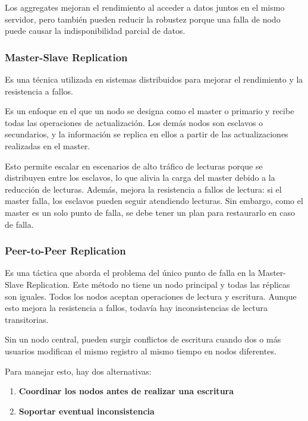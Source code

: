 \documentclass{article}
\begin{document}
		Los aggregates mejoran el rendimiento al acceder a datos juntos en el mismo servidor, pero también pueden reducir la robustez porque una falla de nodo puede causar la indisponibilidad parcial de datos.
		
		
		\subsubsection{Master-Slave Replication}
		Es una técnica utilizada en sistemas distribuidos para mejorar el rendimiento y la resistencia a fallos.
		
		Es un enfoque en el que un nodo se designa como el master o primario y recibe todas las operaciones de actualización. Los demás nodos son esclavos o secundarios, y la información se replica en ellos a partir de las actualizaciones realizadas en el master.
		
		Esto permite escalar en escenarios de alto tráfico de lecturas porque se distribuyen entre los esclavos, lo que alivia la carga del master debido a la reducción de lecturas. Además, mejora la resistencia a fallos de lectura: si el master falla, los esclavos pueden seguir atendiendo lecturas. Sin embargo, como el master es un solo punto de falla, se debe tener un plan para restaurarlo en caso de falla.
		
		\subsubsection{Peer-to-Peer Replication}
		Es una táctica que aborda el problema del único punto de falla en la Master-Slave Replication. Este método no tiene un nodo principal y todas las réplicas son iguales. Todos los nodos aceptan operaciones de lectura y escritura. Aunque esto mejora la resistencia a fallos, todavía hay inconsistencias de lectura transitorias.
		
		Sin un nodo central, pueden surgir conflictos de escritura cuando dos o más usuarios modifican el mismo registro al mismo tiempo en nodos diferentes. 
		
		Para manejar esto, hay dos alternativas:
		\begin{enumerate}
			\item {\textbf{Coordinar los nodos antes de realizar una escritura}}
			
			\item {\textbf{Soportar eventual inconsistencia}}
		\end{enumerate}
		
		
		
\end{document}
